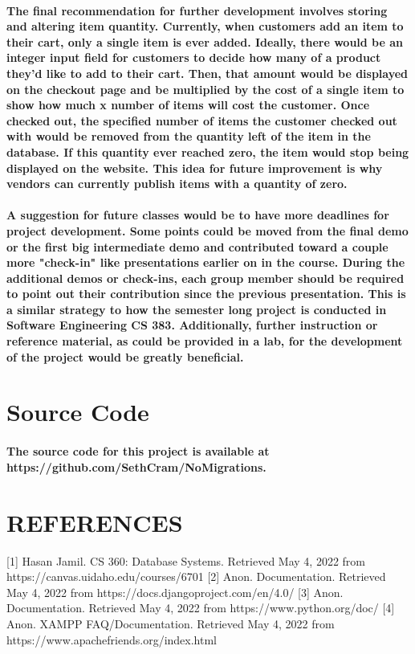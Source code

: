 \documentclass[sigconf]{acmart}
\begin{document}
\paragraph{ The final recommendation for further development involves storing and altering item quantity. Currently, when customers add an item to their cart, only a single item is ever added. Ideally, there would be an integer input field for customers to decide how many of a product they'd like to add to their cart. Then, that amount would be displayed on the checkout page and be multiplied by the cost of a single item to show how much x number of items will cost the customer. Once checked out, the specified number of items the customer checked out with would be removed from the quantity left of the item in the database. If this quantity ever reached zero, the item would stop being displayed on the website. This idea for future improvement is why vendors can currently publish items with a quantity of zero. }

\paragraph{ A suggestion for future classes would be to have more deadlines for project development. Some points could be moved from the final demo or the first big intermediate demo and contributed toward a couple more "check-in" like presentations earlier on in the course. During the additional demos or check-ins, each group member should be required to point out their contribution since the previous presentation. This is a similar strategy to how the semester long project is conducted in Software Engineering CS 383. Additionally, further instruction or reference material, as could be provided in a lab, for the development of the project would be greatly beneficial.}

\section{ Source Code}
\paragraph{ The source code for this project is available at \\ https://github.com/SethCram/NoMigrations. }

\section{REFERENCES}
 [1] Hasan Jamil. CS 360:  Database Systems. Retrieved May 4, 2022 from https://canvas.uidaho.edu/courses/6701 
 [2] Anon. Documentation. Retrieved May 4, 2022 from https://docs.djangoproject.com/en/4.0/ 
 [3] Anon. Documentation. Retrieved May 4, 2022 from https://www.python.org/doc/ 
 [4] Anon. XAMPP FAQ/Documentation. Retrieved May 4, 2022 from https://www.apachefriends.org/index.html 

%
%
\end{document}
